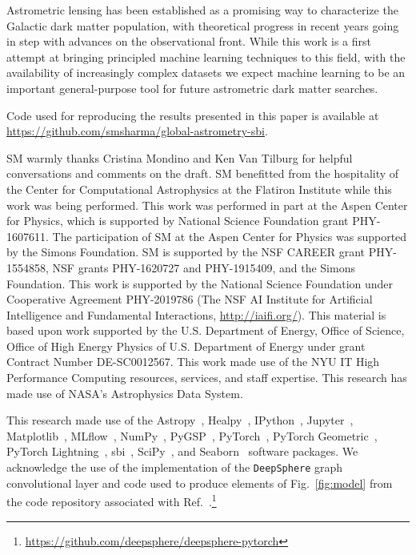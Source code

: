 \documentclass[preprint]{article}
\begin{document}
Astrometric lensing has been established as a promising way to characterize the Galactic dark matter population, with theoretical progress in recent years going in step with advances on the observational front. While this work is a first attempt at bringing principled machine learning techniques to this field, with the availability of increasingly complex datasets we expect machine learning to be an important general-purpose tool for future astrometric dark matter searches.

Code used for reproducing the results presented in this paper is available at \url{https://github.com/smsharma/global-astrometry-sbi}. 

\begin{ack}
SM warmly thanks Cristina Mondino and Ken Van Tilburg for helpful conversations and comments on the draft. SM benefitted from the hospitality of the Center for Computational Astrophysics at the Flatiron Institute while this work was being performed. 
This work was performed in part at the Aspen Center for Physics, which is supported by National Science Foundation grant PHY-1607611.
The participation of SM at the Aspen Center for Physics was supported by the Simons Foundation.
SM is supported by the NSF CAREER grant PHY-1554858, NSF grants PHY-1620727 and PHY-1915409, and the Simons Foundation. 
This work is supported by the National Science Foundation under Cooperative Agreement PHY-2019786 (The NSF AI Institute for Artificial Intelligence and Fundamental Interactions, \url{http://iaifi.org/}).
This material is based upon work supported by the U.S. Department of Energy, Office of Science, Office of High Energy Physics of U.S. Department of Energy under grant Contract Number DE-SC0012567.
This work made use of the NYU IT High Performance Computing resources, services, and staff expertise. 
This research has made use of NASA's Astrophysics Data System. 

This research made use of the Astropy~\cite{Robitaille:2013mpa,Price-Whelan:2018hus},
Healpy~\cite{Gorski:2004by,Zonca2019},
IPython~\cite{PER-GRA:2007},
Jupyter~\cite{Kluyver2016JupyterN},
Matplotlib~\cite{Hunter:2007},
MLflow~\cite{chen2020developments},
NumPy~\cite{harris_array_2020},
PyGSP~\cite{michael_defferrard_2017_1003158},
PyTorch~\cite{NEURIPS2019_9015},
PyTorch Geometric~\cite{Fey/Lenssen/2019}, 
PyTorch Lightning~\cite{william_falcon_2020_3828935},
sbi~\cite{tejero-cantero2020sbi},
SciPy~\cite{2020SciPy-NMeth}, and
Seaborn~\cite{michael_waskom_2017_883859}
software packages.
We acknowledge the use of the implementation of the \texttt{DeepSphere} graph convolutional layer and code used to produce elements of Fig.~\ref{fig:model} from the code repository associated with Ref.~\cite{defferrard2020deepsphere}.\footnote{\url{https://github.com/deepsphere/deepsphere-pytorch}}
\end{ack}
\end{document}
